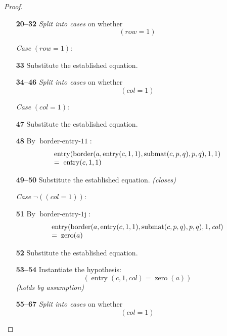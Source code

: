 \documentclass[11pt]{article}
\theoremstyle{plain}
\begin{document}
\begin{proof}
\begin{itemize}[leftmargin=2.8em, itemsep=4pt, parsep=1pt]
  \item[\textbf{20--32}] \emph{Split into cases} on whether
\begin{equation*}
(\mathit{row} = 1)
\end{equation*}

  \item[]\emph{Case} $(\mathit{row} = 1)$:
  \item[\textbf{33}] Substitute the established equation.
  \item[\textbf{34--46}] \emph{Split into cases} on whether
\begin{equation*}
(\mathit{col} = 1)
\end{equation*}

  \item[]\emph{Case} $(\mathit{col} = 1)$:
  \item[\textbf{47}] Substitute the established equation.
  \item[\textbf{48}] By $\operatorname{border\text{-}entry\text{-}11}$:
\begin{equation*}
\begin{array}{@{}l@{}} \operatorname{entry}(\operatorname{border}(a, \operatorname{entry}(c, 1, 1), \operatorname{submat}(c, p, q), p, q), 1, 1) \\ =\; \operatorname{entry}(c, 1, 1) \end{array}
\end{equation*}

  \item[\textbf{49--50}] Substitute the established equation.  \emph{(closes)}
  \item[]\emph{Case} $\lnot((\mathit{col} = 1))$:
  \item[\textbf{51}] By $\operatorname{border\text{-}entry\text{-}1j}$:
\begin{equation*}
\begin{array}{@{}l@{}} \operatorname{entry}(\operatorname{border}(a, \operatorname{entry}(c, 1, 1), \operatorname{submat}(c, p, q), p, q), 1, \mathit{col}) \\ =\; \operatorname{zero}(a) \end{array}
\end{equation*}

  \item[\textbf{52}] Substitute the established equation.
  \item[\textbf{53--54}] Instantiate the hypothesis:
\begin{equation*}
(\operatorname{entry}(c, 1, \mathit{col}) = \operatorname{zero}(a))
\end{equation*}
  \emph{(holds by assumption)}
  \item[\textbf{55--67}] \emph{Split into cases} on whether
\begin{equation*}
(\mathit{col} = 1)
\end{equation*}


\end{itemize}
\end{proof}
\end{document}
